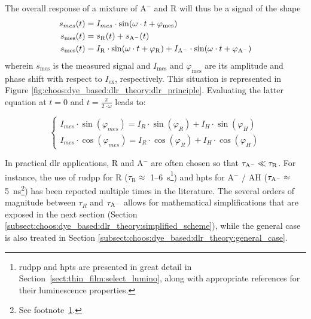 The overall response of a mixture of A$^-$ and R will thus be a signal of the shape
\begin{equation}\label{eq:choos:dye_based:dlr_theory:s_mes_def}
	\begin{aligned}
		s_{mes}(t) &= I_{mes} \cdot \sin(\omega \cdot t + \varphi_\text{mes})\\
		s_\text{mes}(t) &= s_\mathrm{R}(t) + s_\mathrm{A^{\smash{-}}}(t)\\
		s_\text{mes}(t) &= I_\mathrm{R} \cdot \sin(\omega \cdot t + \varphi_\mathrm{R}) + I_\mathrm{A^{\smash{-}}} \cdot \sin(\omega \cdot t + \varphi_\mathrm{A^{\smash{-}}})
	\end{aligned}
\end{equation}
wherein $s_\text{mes}$ is the measured signal and $I_\text{mes}$ and $\varphi_\text{mes}$ are its amplitude and phase shift with respect to $I_\text{ex}$, respectively. This situation is represented in Figure \ref{fig:choos:dye_based:dlr_theory:dlr_principle}. Evaluating the latter equation at $t=0$ and $t=\frac{\pi}{2 \cdot \omega}$ leads to:

\begin{equation}\label{eq:choos:dye_based:dlr_theory:sincos_full}
	\begin{cases}
		I_{mes} \cdot \sin(\varphi_{mes}) = I_{R} \cdot \sin(\varphi_{R}) + I_{H} \cdot \sin(\varphi_{H})\\
		I_{mes} \cdot \cos(\varphi_{mes}) = I_{R} \cdot \cos(\varphi_{R}) + I_{H} \cdot \cos(\varphi_{H})
	\end{cases}
\end{equation}

In practical \gls{dlr} applications, R and A$^-$ are often chosen so that $\tau_\mathrm{A^{\smash{-}}} \ll \tau_\mathrm{R}$. For instance, the use of \gls{rudpp} for R ($\tau_\mathrm{R} \approx$ 1--6~\textmu{}s\footnote{\label{footnote:fluo_details}\gls{rudpp} and \gls{hpts} are presented in great detail in Section~\ref{sect:thin_film:select_lumino}, along with appropriate references for their luminescence properties.}) and \gls{hpts} for A$^-$ / AH ($\tau_\mathrm{A^{\smash{-}}} \approx$ 5~ns\footnote{See footnote~\ref*{footnote:fluo_details}.}) has been reported multiple times in the literature\cite{bultzingslowen2002, burke2006, cajlakovic2006}. The several orders of magnitude between $\tau_R$ and $\tau_\mathrm{A^{\smash{-}}}$ allows for mathematical simplifications that are exposed in the next section (Section \ref{subsect:choos:dye_based:dlr_theory:simplified_scheme}), while the general case is also treated in Section \ref{subsect:choos:dye_based:dlr_theory:general_case}.

